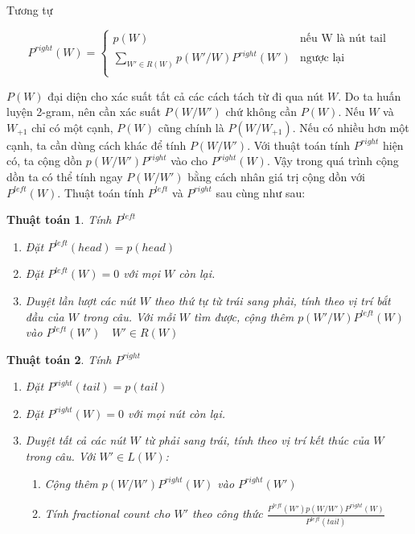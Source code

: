 \documentclass[a4paper,oneside]{book} %
\newtheorem{algo}{Thuật toán}
\begin{document}
Tương tự

$$
P^{right}(W) = \left\{
    \begin{array}{ll}
      p(W)&\text{nếu W là nút tail}\\
      \displaystyle\sum_{W' \in R(W)}p(W'/W)P^{right}(W')&\text{ngược lại}\\
    \end{array}
  \right.
$$

$P(W)$ đại diện cho xác suất tất cả các cách tách từ đi qua nút
$W$. Do ta huấn luyện 2-gram, nên cần xác suất $P(W/W')$ chứ không cần
$P(W)$. Nếu $W$ và $W_{+1}$ chỉ có một cạnh, $P(W)$ cũng chính là
$P(W/W_{+1})$. Nếu có nhiều hơn một cạnh, ta cần dùng cách khác để
tính $P(W/W')$. Với thuật toán tính $P^{right}$ hiện có, ta cộng dồn
$p(W/W')P^{right}$ vào cho $P^{right}(W)$. Vậy trong quá trình cộng
dồn ta có thể tính ngay $P(W/W')$ bằng cách nhân giá trị cộng dồn với
$P^{left}(W)$. Thuật toán tính $P^{left}$ và $P^{right}$ sau cùng như
sau:

\begin{algo}Tính $P^{left}$

\begin{enumerate}
\item Đặt $P^{left}(head) = p(head)$
\item Đặt $P^{left}(W) = 0$ với mọi $W$ còn lại.
\item Duyệt lần lượt các nút $W$ theo thứ tự từ trái sang phải, tính
  theo vị trí bắt đầu của $W$ trong câu.
  Với mỗi $W$ tìm được, cộng thêm $p(W'/W)P^{left}(W)$ vào $P^{left}(W')\quad
  W' \in R(W)$
\end{enumerate}
\end{algo}

\begin{algo}Tính $P^{right}$
  
\begin{enumerate}
\item Đặt $P^{right}(tail) = p(tail)$
\item Đặt $P^{right}(W) = 0$ với mọi nút còn lại.
\item Duyệt tất cả các nút $W$ từ phải sang trái, tính theo vị trí kết
  thúc của $W$ trong câu. Với $W' \in L(W)$:
  \begin{enumerate}
  \item Cộng thêm $p(W/W')P^{right}(W)$ vào $P^{right}(W')$
  \item Tính fractional count cho $W'$ theo công thức
    $\displaystyle\frac{P^{left}(W')p(W/W')P^{right}(W)}{P^{left}(tail)}$
  \end{enumerate}
\end{enumerate}
\end{algo}
\end{document}

